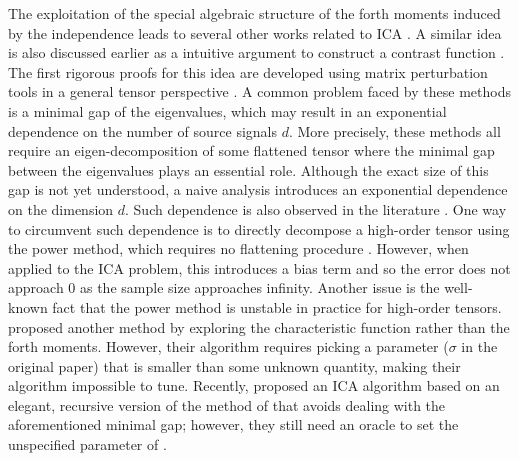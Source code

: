 \documentclass{article}
\newcommand{\todoa}[2][]{ \todo[color=Purple!20,size=\tiny,#1]{#2}} %
\theoremstyle{definition}
\begin{document}

The exploitation of the special algebraic structure of the forth moments induced by the independence leads to several other works related to ICA \citep{hsu2013learning,anandkumar2012tensordecomposition,anandkumar2012method}. 
A similar idea is also discussed earlier as a intuitive argument to construct a contrast function \citep{cardoso1999high}. 
The first rigorous proofs for this idea are developed using matrix perturbation tools in a general tensor perspective \citep{anandkumar2012tensordecomposition,anandkumar2012method,goyal2014fourier}. 
A common problem faced by these methods is a minimal gap of the eigenvalues, which may result in an exponential dependence on the number of source signals $d$.
More precisely, these methods all require an eigen-decomposition of some flattened tensor where the minimal gap between the eigenvalues plays an essential role. 
Although the exact size of this gap is not yet understood, a naive analysis introduces an exponential dependence on the dimension $d$. 
Such dependence is also observed in the literature \citep{cardoso1999high,goyal2014fourier}.
One way to circumvent such dependence is to directly decompose a high-order tensor using the power method, which requires no flattening procedure \citep{anandkumar2014guaranteed}. 
However, when applied to the ICA problem, this introduces a bias term and so the error does not approach 0 as the sample size approaches infinity.
Another issue is the well-known fact that the power method is unstable in practice for high-order tensors. 
\citet{goyal2014fourier} proposed another method by exploring the characteristic function rather than the forth moments.
However, their algorithm requires picking a parameter ($\sigma$ in the original paper) that is smaller than some unknown quantity, making their algorithm impossible to tune.
Recently, \citet{vempala2014max} proposed an ICA algorithm based on an elegant, recursive version of the method of \citet{goyal2014fourier} that avoids dealing with the aforementioned minimal gap; however, they still need an oracle to set the unspecified parameter of \citet{goyal2014fourier}.
\end{document}
